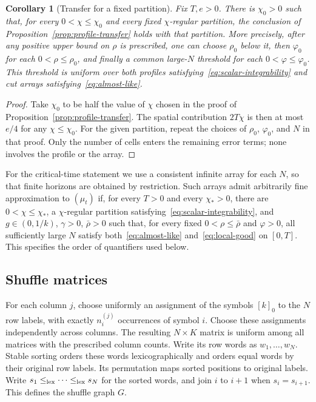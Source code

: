\documentclass[11pt]{article}
\numberwithin{equation}{section}
\newtheorem{corollary}[theorem]{Corollary}
\theoremstyle{definition}
\theoremstyle{remark}
\newcommand{\1}{\mathbf 1}
\begin{document}
\begin{corollary}[Transfer for a fixed partition]%
\label{cor:fixed-partition-transfer}
Fix $T,e>0$. There is $\chi_0>0$ such that, for every
$0<\chi\le\chi_0$ and every fixed $\chi$-regular partition, the
conclusion of Proposition~\ref{prop:profile-transfer} holds with that
partition. More precisely, after any positive upper bound on $\rho$
is prescribed, one can choose $\rho_0$ below it, then $\varphi_0$
for each $0<\rho\le\rho_0$, and finally a common large-$N$
threshold for each $0<\varphi\le\varphi_0$. This threshold is
uniform over both profiles satisfying~\eqref{eq:scalar-integrability}
and cut arrays satisfying~\eqref{eq:almost-like}.
\end{corollary}

\begin{proof}
Take $\chi_0$ to be half the value of $\chi$ chosen in the proof of
Proposition~\ref{prop:profile-transfer}. The spatial contribution
$2T\chi$ is then at most $e/4$ for any $\chi\le\chi_0$. For the
given partition, repeat the choices of $\rho_0$, $\varphi_0$, and
$N$ in that proof. Only the number of cells enters the remaining
error terms; none involves the profile or the array.
\end{proof}

For the critical-time statement we use a consistent infinite array for
each $N$, so that finite horizons are obtained by restriction. Such
arrays admit arbitrarily fine approximation to $(\mu_t)$ if, for every
$T>0$ and every $\chi_*>0$, there are $0<\chi\le\chi_*$, a
$\chi$-regular partition satisfying~\eqref{eq:scalar-integrability},
and $g\in(0,1/k)$, $\gamma>0$, $\bar\rho>0$ such that, for every
fixed $0<\rho\le\bar\rho$ and $\varphi>0$, all sufficiently large
$N$ satisfy both~\eqref{eq:almost-like} and~\eqref{eq:local-good}
on $[0,T]$. This specifies the order of quantifiers used below.



\subsection{Shuffle matrices}
For each column $j$, choose uniformly an assignment of the symbols
$[k]_0$ to the $N$ row labels, with exactly $n_i^{(j)}$ occurrences of
symbol $i$. Choose these assignments independently across columns.
The resulting $N\times K$ matrix is uniform among all matrices with
the prescribed column counts. Write its row words as $w_1,\ldots,w_N$.
Stable sorting orders these words lexicographically and orders equal
words by their original row labels. Its permutation maps sorted
positions to original labels. Write $s_1\le_{\rm lex}\cdots\le_{\rm lex}s_N$
for the sorted words, and join $i$ to $i+1$ when $s_i=s_{i+1}$.
This defines the shuffle graph $G$.
\end{document}

